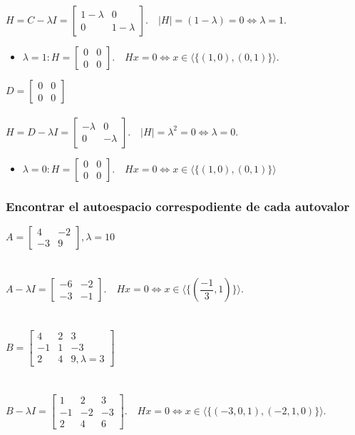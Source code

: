 \documentclass{article}
\begin{document}
$H = C - \lambda I = \begin{bmatrix} 1-\lambda&0 \\ 0 & 1-\lambda \end{bmatrix}. \quad |H| = (1-\lambda) = 0 \Longleftrightarrow \lambda = 1$. \\
\begin{itemize}
\item
	$\lambda = 1: H = \begin{bmatrix} 0&0\\0&0\end{bmatrix}. \quad Hx = 0 \Longleftrightarrow x \in \langle \{ (1,0),(0,1) \} \rangle$.
\end{itemize}
$D = \begin{bmatrix} 0&0\\0&0\end{bmatrix}$ \\ \\
$H = D - \lambda I = \begin{bmatrix} -\lambda&0\\0&-\lambda \end{bmatrix}. \quad |H| = \lambda^2 = 0 \Longleftrightarrow \lambda = 0$.
\begin{itemize}
\item
	$\lambda = 0: H = \begin{bmatrix} 0&0\\0&0 \end{bmatrix}. \quad Hx = 0 \Longleftrightarrow x \in \langle \{ (1,0),(0,1) \} \rangle$
\end{itemize}
\subsubsection{Encontrar el autoespacio correspodiente de cada autovalor}
$A = \begin{bmatrix} 4&-2\\-3&9 \end{bmatrix}, \lambda = 10$ \\ \\ \\
$A - \lambda I = \begin{bmatrix} -6&-2\\-3&-1\end{bmatrix}. \quad Hx = 0 \Longleftrightarrow x \in \langle \{ (\dfrac{-1}3,1) \} \rangle$. \\ \\ \\
$B = \begin{bmatrix} 4&2&3\\-1&1&-3\\2&4&9, \lambda = 3 \end{bmatrix}$ \\ \\ \\
$B - \lambda I = \begin{bmatrix} 1&2&3\\-1&-2&-3\\2&4&6 \end{bmatrix}. \quad Hx = 0 \Longleftrightarrow x \in 
\langle \{ (-3,0,1),(-2,1,0) \} \rangle$.
\end{document}
